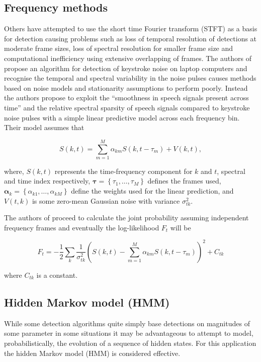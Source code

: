 \subsection{Frequency methods}
Others have attempted to use the short time Fourier transform (STFT) as a basis for detection \cite{Czyzewski1995}\cite{Subramanya2007}\cite{Sugiyama2007}\cite{Abramson2007} causing problems such as loss of temporal resolution of detections at moderate frame sizes, loss of spectral resolution for smaller frame size and computational inefficiency using extensive overlapping of frames. The authors of \cite{Subramanya2007} propose an algorithm for detection of keystroke noise on laptop computers and recognise the temporal and spectral variability in the noise pulses causes methods based on noise models and stationarity assumptions to perform poorly. Instead the authors propose to exploit the ``smoothness in speech signals present across time'' and the relative spectral sparsity of speech signals compared to keystroke noise pulses with a simple linear predictive model across each frequency bin. Their model assumes that

\begin{equation}
\label{eq:Subramanya2007}
S(k,t) = \sum_{m=1}^M \alpha_{km} S(k,t - \tau_m) + V(k,t),
\end{equation}

where, $S(k,t)$ represents the time-frequency component for $k$ and $t$, spectral and time index respectively, $\boldsymbol{\tau} = \left\{\tau_1, \ldots ,\tau_M \right\}$ defines the frames used, $\boldsymbol{\alpha}_k = \left\{\alpha_{k1},\ldots,\alpha_{kM} \right\}$ define the weights used for the linear prediction, and $V(t,k)$ is some zero-mean Gaussian noise with variance $\sigma^2_{tk}$.

The authors of \cite{Subramanya2007} proceed to calculate the joint probability assuming independent frequency frames and eventually the log-likelihood $F_t$ will be

\begin{equation}
\label{eq:Subramanya2007_2}
F_t = - \frac{1}{2} \sum_k \frac{1}{\sigma^2_{tk}} \left( S\left(k,t\right) - \sum_{m=1}^M \alpha_{km} S(k,t-\tau_m)\right)^2 + C_{tk}
\end{equation}

where $C_{tk}$ is a constant.

\subsection{Hidden Markov model (HMM)}
While some detection algorithms quite simply base detections on magnitudes of some parameter\cite{Subramanya2007}\cite{Sugiyama2007} in some situations it may be advantageous to attempt to model, probabilistically, the evolution of a sequence of hidden states. For this application the hidden Markov model (HMM) is considered effective\cite{Rabiner1989}\cite{Xu2005}.

